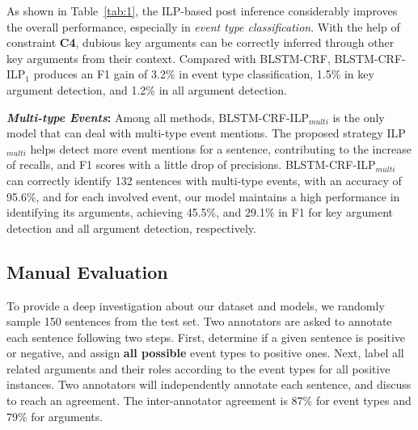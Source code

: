 As shown in Table~\ref{tab:1}, the ILP-based post inference considerably improves the overall performance, especially in \textit{event type classification}. With the help of constraint \textbf{C4},  dubious key arguments can be correctly inferred through other key arguments from their context. Compared with BLSTM-CRF, BLSTM-CRF-ILP$_1$ produces an F1 gain of 3.2\% in event type classification, 1.5\% in key argument detection, and 1.2\% in all argument detection. %

\vspace{2mm}\noindent\textbf{\emph{Multi-type Events}:}
Among all methods, BLSTM-CRF-ILP$_{multi}$ is the only model that can deal with multi-type event mentions. %
The proposed strategy ILP$_{multi}$ helps detect more event mentions for a sentence, contributing to the increase of recalls, and F1 scores with a little drop of precisions.
BLSTM-CRF-ILP$_{multi}$ can correctly identify 132 sentences with multi-type events,
with an accuracy of 95.6\%, and for each involved event, our model maintains a high
performance in identifying its arguments, achieving 45.5\%, and 29.1\% in F1 for key argument detection and all argument detection, respectively.

\subsection{Manual Evaluation}\label{manualeve}
To provide a deep investigation about our dataset and models, we randomly sample 150 sentences from the test set. Two annotators are asked
to annotate each sentence following two steps. First, determine if a given sentence is positive or negative, and assign \textbf{all
possible} event types to positive ones. Next, label all related arguments and their roles according to the event types for all positive
instances. Two annotators will independently annotate each sentence, and discuss to reach an agreement. The inter-annotator agreement is
87\% for event types and 79\% for arguments.



